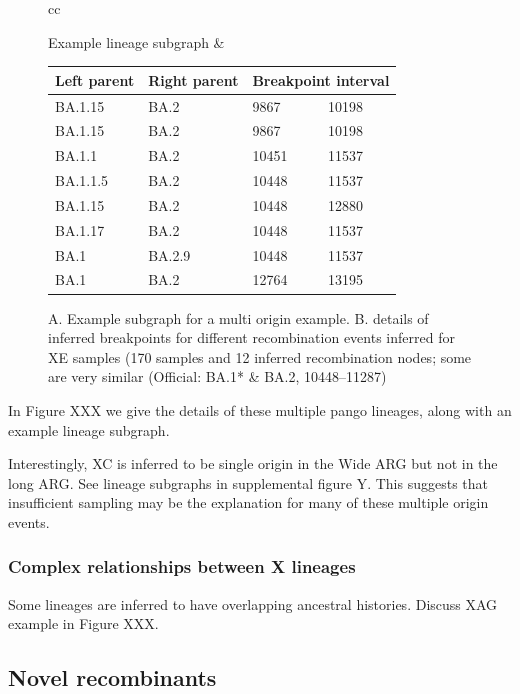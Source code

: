 \documentclass{article}
\begin{document}
\begin{figure}
\begin{tabular}{cc}

Example lineage subgraph
 &

\begin{tabular}{llll}
\toprule
Left parent & Right parent & \multicolumn{2}{l}{Breakpoint interval}\\
\midrule
BA.1.15 & BA.2  &9867  &10198\\
BA.1.15 & BA.2  &9867  &10198\\
BA.1.1  &BA.2  &10451  &11537\\
BA.1.1.5 & BA.2 &10448 & 11537\\
BA.1.15 & BA.2  &10448  &12880\\
BA.1.17 & BA.2  &10448 & 11537\\
BA.1  &BA.2.9  &10448 & 11537\\
BA.1  &BA.2  &12764  &13195\\
\bottomrule
\end{tabular}
\end{tabular}
\caption{A. Example subgraph for a multi origin example. B. details
of inferred breakpoints for different recombination events inferred
for XE samples (170 samples and 12 inferred recombination nodes; some are very
similar (Official: BA.1* \& BA.2, 10448–11287)}
\end{figure}

In Figure XXX we give the details of these multiple pango lineages,
along with an example lineage subgraph.

Interestingly, XC is inferred to be single origin in the Wide ARG but
not in the long ARG. See lineage subgraphs in supplemental figure Y.
This suggests that insufficient sampling may be the explanation for
many of these multiple origin events.

\subsubsection{Complex relationships between X lineages}

Some lineages are inferred to have overlapping ancestral histories.
Discuss XAG example in Figure XXX.

\subsection{Novel recombinants}
\end{document}
